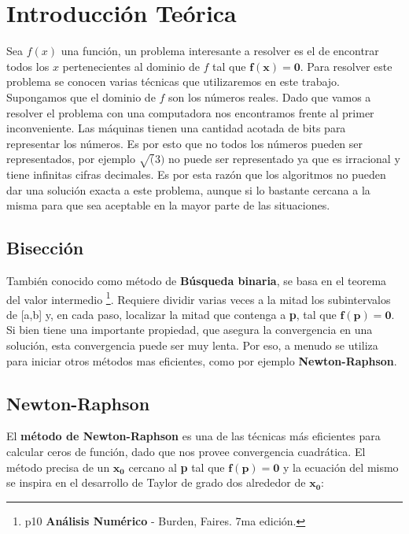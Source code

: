 \documentclass[a4paper]{article}
\begin{document}
\section{Introducción Teórica}
Sea $f(x)$ una función, un problema interesante a resolver es el de encontrar todos los $x$ pertenecientes al dominio de $f$ tal que $\mathbf{f(x) = 0}$. Para resolver este problema se conocen varias técnicas que utilizaremos en este trabajo. \\
Supongamos que el dominio de $f$ son los números reales. Dado que vamos a resolver el problema con una computadora nos encontramos frente al primer inconveniente. Las máquinas tienen una cantidad acotada de bits para representar los números. Es por esto que no todos los números pueden ser representados, por ejemplo $\sqrt(3)$ no puede ser representado ya que es irracional y tiene infinitas cifras decimales. Es por esta razón que los algoritmos no pueden dar una solución exacta a este problema, aunque si lo bastante cercana a la misma para que sea aceptable en la mayor parte de las situaciones. 
  
\subsection{Bisección}
También conocido como método de \textbf{Búsqueda binaria}, se basa en el teorema del valor intermedio \footnote{  p10 \textbf{Análisis Numérico} - Burden, Faires. 7ma edición. }. 
Requiere dividir varias veces a la mitad los subintervalos de [a,b] y, en cada paso, localizar la mitad que 
contenga a \textbf{p}, tal que $\mathbf{f(p) = 0}$.
Si bien tiene una importante propiedad, que asegura la convergencia en una solución, 
esta convergencia puede ser muy lenta. 
Por eso, a menudo se utiliza para iniciar otros métodos mas eficientes, como por ejemplo \textbf{Newton-Raphson}.

\subsection{Newton-Raphson}
El \textbf{método de Newton-Raphson} es una de las técnicas más eficientes para calcular ceros de función,
dado que nos provee convergencia cuadrática. El método precisa de un $\mathbf{x_0}$ cercano 
al \textbf{p} tal que $\mathbf{f(p) = 0}$ y la ecuación del mismo se inspira en el desarrollo de
Taylor de grado dos alrededor de $\mathbf{x_0}$:
\end{document}
